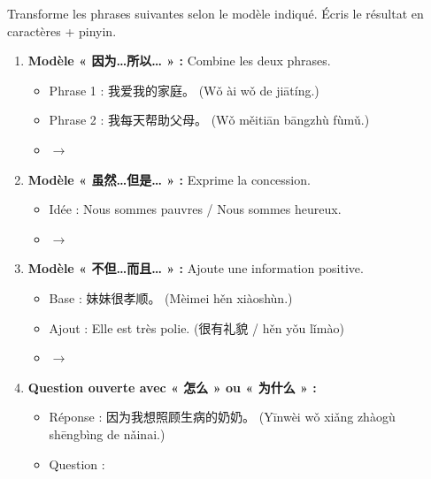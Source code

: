 \documentclass[11pt]{article}
\begin{document}
\begin{exercice}
Transforme les phrases suivantes selon le modèle indiqué. Écris le résultat en caractères + pinyin.

\begin{enumerate}
    \item \textbf{Modèle « 因为…所以… » :} Combine les deux phrases.
    \begin{itemize}
        \item Phrase 1 : 我爱我的家庭。 (Wǒ ài wǒ de jiātíng.)
        \item Phrase 2 : 我每天帮助父母。 (Wǒ měitiān bāngzhù fùmǔ.)
        \item $\rightarrow$ \underline{\hspace{8cm}}
    \end{itemize}
    \item \textbf{Modèle « 虽然…但是… » :} Exprime la concession.
    \begin{itemize}
        \item Idée : Nous sommes pauvres / Nous sommes heureux.
        \item $\rightarrow$ \underline{\hspace{8cm}}
    \end{itemize}
    \item \textbf{Modèle « 不但…而且… » :} Ajoute une information positive.
    \begin{itemize}
        \item Base : 妹妹很孝顺。 (Mèimei hěn xiàoshùn.)
        \item Ajout : Elle est très polie. (很有礼貌 / hěn yǒu lǐmào)
        \item $\rightarrow$ \underline{\hspace{8cm}}
    \end{itemize}
    \item \textbf{Question ouverte avec « 怎么 » ou « 为什么 » :}
    \begin{itemize}
        \item Réponse : 因为我想照顾生病的奶奶。 (Yīnwèi wǒ xiǎng zhàogù shēngbìng de nǎinai.)
        \item Question : \underline{\hspace{8cm}}
    \end{itemize}
\end{enumerate}
\end{exercice}
\end{document}
